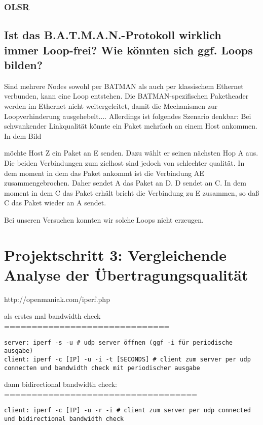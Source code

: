 \documentclass[a4paper,10pt]{article}
\begin{document}

\subsubsection*{OLSR}

\subsection{Ist das B.A.T.M.A.N.-Protokoll wirklich immer Loop-frei? Wie könnten sich ggf. Loops bilden?}
Sind mehrere Nodes sowohl per BATMAN als auch per klassischem Ethernet verbunden, kann eine Loop entstehen. Die BATMAN-spezifischen Paketheader werden im Ethernet nicht weitergeleitet, damit die Mechanismen zur Loopverhinderung ausgehebelt....
 Allerdings ist folgendes Szenario denkbar:
Bei schwankender Linkqualität könnte ein Paket mehrfach an einem Host ankommen.
In dem Bild



möchte Host Z ein Paket an E senden. Dazu wählt er seinen nächsten Hop A aus.
Die beiden Verbindungen zum zielhost sind jedoch von schlechter qualität.
In dem moment in dem das Paket ankommt ist die Verbindung AE zusammengebrochen.
Daher sendet A das Paket an D.
D sendet an C.
In dem moment in dem C das Paket erhält bricht die Verbindung zu E zusammen, so daß C das Paket wieder an A sendet.

Bei unseren Versuchen konnten wir solche Loops nicht erzeugen.


\section{Projektschritt 3: Vergleichende Analyse der Übertragungsqualität}

http://openmaniak.com/iperf.php

als erstes mal bandwidth check
==============================

\begin{lstlisting}
server: iperf -s -u # udp server öffnen (ggf -i für periodische ausgabe)
client: iperf -c [IP] -u -i -t [SECONDS] # client zum server per udp connecten und bandwidth check mit periodischer ausgabe
\end{lstlisting}


dann bidirectional bandwidth check:
===================================

\begin{lstlisting}
client: iperf -c [IP] -u -r -i # client zum server per udp connected und bidirectional bandwidth check
\end{lstlisting}
\end{document}
